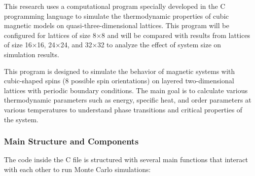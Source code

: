 This research uses a computational program specially developed in the C programming language to simulate the thermodynamic properties of cubic magnetic models on quasi-three-dimensional lattices. This program will be configured for lattices of size 8×8 and will be compared with results from lattices of size 16×16, 24×24, and 32×32 to analyze the effect of system size on simulation results.

This program is designed to simulate the behavior of magnetic systems with cubic-shaped spins (8 possible spin orientations) on layered two-dimensional lattices with periodic boundary conditions. The main goal is to calculate various thermodynamic parameters such as energy, specific heat, and order parameters at various temperatures to understand phase transitions and critical properties of the system.

\subsubsection{Main Structure and Components}

The code inside the C file is structured with several main functions that interact with each other to run Monte Carlo simulations:

